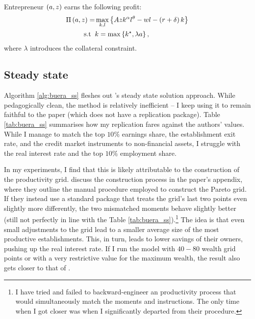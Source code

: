 \documentclass[12pt, leqno]{article}
\begin{document}
Entrepreneur $\left( a,z \right)$ earns the following profit:
\begin{equation}
    \begin{aligned} \label{eq:buera_profit}
        \Pi \bp{a,z} = & \max_{k,l} \bc{ A z k^{\alpha} l^{\theta} - w l - \bp{r+\delta} k } \\
        \text{s.t} \; \; & k = \max \bc{k^\star, \lambda a},
    \end{aligned}
\end{equation}
where $\lambda$ introduces the collateral constraint. 

\subsection{Steady state}

Algorithm \ref{alg:buera_ss} fleshes out \citet{buera_anatomy_2015}'s steady state solution approach.
While pedagogically clean, the method is relatively inefficient -- I keep using it to remain faithful to the paper (which does not have a replication package).
Table \ref{tab:buera_ss} summarises how my replication fares against the authors' values. 
While I manage to match the top $10\%$ earnings share, the establishment exit rate, and the credit market instruments to non-financial assets,
I struggle with the real interest rate and the top $10\%$ employment share. 

\begin{table}[H]
    \caption{Comparing data, original model, and replication}
    \label{tab:buera_ss}
    
\end{table}

In my experiments, I find that this is likely attributable to the construction of the productivity grid.
\citet{buera_anatomy_2015} discuss the construction process in the paper's appendix, where they outline the manual procedure employed to construct the Pareto grid.
If they instead use a standard package that treats the grid's last two points even slightly more differently, the two mismatched moments behave slightly better (still not perfectly in line with the Table \ref{tab:buera_ss}).\footnote{
    I have tried and failed to backward-engineer an  productivity process that would simultaneously match the moments and instructions.
    The only time when I got closer was when I significantly departed from their procedure.
} 
The idea is that even small adjustments to the grid lead to a smaller average size of the most productive establishments. 
This, in turn, leads to lower savings of their owners, pushing up the real interest rate.
If I  run the model with $40-80$ wealth grid points or with a very restrictive value for the maximum wealth, the result also gets closer to that of \citet{buera_anatomy_2015}.
\\
\end{document}

